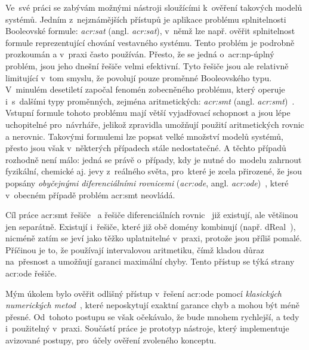 \documentclass[thesis=M,czech]{FITthesis}[2012/06/26]
\newcommand{\acrlabel}[1]{acr:#1}
\newcommand{\acr}[1]{\acrshort{\acrlabel{#1}}}
\newcommand{\acrl}[1]{\acrlong{\acrlabel{#1}}}
\newcommand{\hl}[1]{\textit{#1}}
\newcommand{\name}[1]{\hl{#1}}
\newcommand{\cit}[1]{\cite{#1}}
\begin{document}
\begin{introduction}
Ve~své práci se zabývám možnými nástroji
sloužícími k~ověření takových modelů systémů.
Jedním z~nejznámějších přístupů
je aplikace problému splnitelnosti Booleovské formule:
\name{\acr{sat}} (angl. \name{\acrl{sat}}),
v~němž lze např. ověřit splnitelnost
formule reprezentující chování vestavného systému.
Tento problém je podrobně prozkoumán
a v~praxi často používán.
Přesto, že se jedná o~\acr{np}-úplný problém,
jsou jeho dnešní řešiče velmi efektivní.
Tyto řešiče jsou ale relativně limitující
v~tom smyslu, že povolují pouze proměnné Booleovského typu.
V~minulém desetiletí započal fenomén
zobecněného problému,
který operuje i~s~dalšími typy proměnných,
zejména aritmetických: \name{\acr{smt}}
(angl. \name{\acrl{smt}})~\cit{smt-de_moura}\cit{smt}.
Vstupní formule tohoto problému mají
větší vyjadřovací schopnost
a jsou lépe uchopitelné pro~návrháře,
jelikož zpravidla umožňují použití
aritmetických rovnic a nerovnic.
Takovými formulemi lze popsat velké množství modelů systémů,
přesto jsou však v~některých případech stále nedostatečné.
A těchto případů rozhodně není málo:
jedná se právě o~případy, kdy je nutné
do~modelu zahrnout fyzikální, chemické aj.
jevy z~reálného světa,
pro~které je zcela přirozené,
že jsou popsány \name{obyčejnými diferenciálními rovnicemi}
(\name{\acr{ode}}, angl. \name{\acrl{ode}})~\cit{ode-lec}\cit{ode},
které v~obecném případě problém \acr{smt} neovládá.


\begin{section}{Cíl práce}\label{s:intro:goal}
\acr{smt} řešiče~\cit{opensmt-art}\cit{cvc4-art}
a řešiče diferenciálních rovnic~\cit{sundials-art}\cit{odeint-art}
již existují, ale většinou jen separátně.
Existují i~řešiče, které již obě domény kombinují
(např. dReal~\cit{dreal-smo-art}),
nicméně zatím se jeví jako těžko uplatnitelné v~praxi,
protože jsou příliš pomalé.
Příčinou je to, že používají intervalovou aritmetiku,
čímž kladou důraz na~přesnost
a umožňují garanci maximální chyby.
Tento přístup se týká strany
\acr{ode} řešiče.

Mým úkolem bylo ověřit
odlišný přístup v~řešení \acr{ode}
pomocí \name{klasických numerických metod}~\cit{ode-nsolve-intro},
které neposkytují exaktní garance chyb
a mohou být méně přesné.
Od~tohoto postupu se však očekávalo,
že bude mnohem rychlejší,
a tedy i~použitelný v~praxi.
Součástí práce je prototyp nástroje,
který implementuje avizované postupy,
pro~účely ověření zvoleného konceptu.


\end{section}
\end{introduction}
\end{document}
